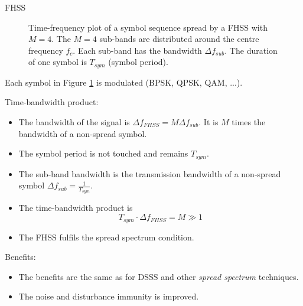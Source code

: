 \begin{refsection}
\begin{example}{\acs{FHSS}}
\begin{figure}[H]
		\caption[Time-frequency plot of a symbol sequence spread by a \acs{FHSS} with $M = 4$]{Time-frequency plot of a symbol sequence spread by a \acs{FHSS} with $M = 4$. The $M = 4$ sub-bands are distributed around the centre frequency $f_c$. Each sub-band has the bandwidth $\Delta f_{sub}$. The duration of one symbol is $T_{sym}$ (symbol period).}
		\label{fig:ch07:fhss_ex}
	\end{figure}

	Each symbol in Figure \ref{fig:ch07:fhss_ex} is modulated (\ac{BPSK}, \ac{QPSK}, \ac{QAM}, ...).
\end{example}

Time-bandwidth product:
\begin{itemize}
	\item The bandwidth of the signal is $\Delta f_{FHSS} = M \Delta f_{sub}$. It is $M$ times the bandwidth of a non-spread symbol.
	\item The symbol period is not touched and remains $T_{sym}$.
	\item The sub-band bandwidth is the transmission bandwidth of a non-spread symbol $\Delta f_{sub} = \frac{1}{T_{sym}}$.
	\item The time-bandwidth product is
	\begin{equation}
		T_{sym} \cdot \Delta f_{FHSS} = M \gg 1
	\end{equation}
	\item The \ac{FHSS} fulfils the spread spectrum condition.
\end{itemize}

Benefits:
\begin{itemize}
	\item The benefits are the same as for \ac{DSSS} and other \emph{spread spectrum} techniques.
	\item The noise and disturbance immunity is improved.
\end{itemize}


\end{refsection}
